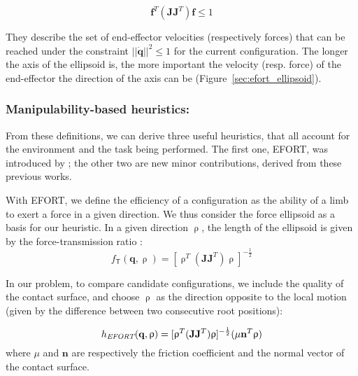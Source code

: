  \begin{equation} 
 \label{eq:for}
\mathbf{f}^T (\mathbf{J}\mathbf{J}^T) \mathbf{f} \leq 1
\end{equation}

They describe the set of end-effector velocities (respectively forces) that can
be reached under the constraint $||\dot{\mathbf{q}}||^2 \leq 1$ for the current configuration.
The longer the axis of the ellipsoid is, the more important the velocity (resp. force) of the end-effector the direction of the axis can be (Figure~\ref{sec:efort_ellipsoid}).
 
 

\subsubsection{Manipulability-based heuristics:}
From these definitions, we can derive three useful heuristics, that all account for the environment and the task being performed.
The first one, EFORT, was introduced by \cite{Tonneau2014}; the other two are new minor contributions, derived from these previous works.

With EFORT, we define the efficiency of a configuration as the ability of a limb to exert a force in a given direction.
We thus consider the force ellipsoid as a basis for our heuristic.
In a given direction $\uprho$, the length of the ellipsoid is given by the force-transmission ratio \citep{1087795}:
\begin{equation*}
f_\mathsf{T}(\mathbf{q}, \uprho) = [\uprho^{T}(\mathbf{J}\mathbf{J}	^{T})\uprho]^{-\frac{1}{2}}
\end{equation*}

In our problem, to compare candidate configurations, we include the quality of the contact surface, and choose $\uprho$ as the direction
opposite to the local motion (given by the difference between two consecutive root positions):

\begin{equation}
h_{\textrm{\it EFORT}}(\mathbf{q}, \uprho) = [\uprho^{T}(\mathbf{J}\mathbf{J}^T)\uprho]^{-\frac{1}{2}} ( \mu \mathbf{n}^T \uprho)
\end{equation}
where $\mu$ and $\mathbf{n}$ are respectively the friction coefficient and the normal vector of the contact surface.


